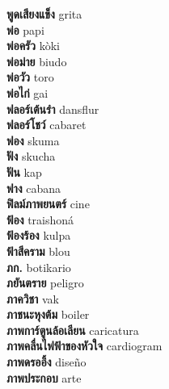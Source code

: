 \textbf{ พูดเสียงแข็ง  } grita \\
\textbf{ พ่อ  } papi \\
\textbf{ พ่อครัว  } kòki \\
\textbf{ พ่อม่าย  } biudo \\
\textbf{ พ่อวัว  } toro \\
\textbf{ พ่อไก่  } gai \\
\textbf{ ฟลอร์เต้นรำ  } dansflur \\
\textbf{ ฟลอร์โชว์  } cabaret \\
\textbf{ ฟอง  } skuma \\
\textbf{ ฟัง  } skucha \\
\textbf{ ฟัน  } kap \\
\textbf{ ฟาง  } cabana \\
\textbf{ ฟิลม์ภาพยนตร์  } cine \\
\textbf{ ฟ้อง  } traishoná \\
\textbf{ ฟ้องร้อง  } kulpa \\
\textbf{ ฟ้าสีคราม  } blou \\
\textbf{ ภก.  } botikario \\
\textbf{ ภยันตราย  } peligro \\
\textbf{ ภาควิชา  } vak \\
\textbf{ ภาชนะหุงต้ม  } boiler \\
\textbf{ ภาพการ์ตูนล้อเลียน  } caricatura \\
\textbf{ ภาพคลื่นไฟฟ้าของหัวใจ  } cardiogram \\
\textbf{ ภาพดรออิ้ง  } diseño \\
\textbf{ ภาพประกอบ  } arte \\
